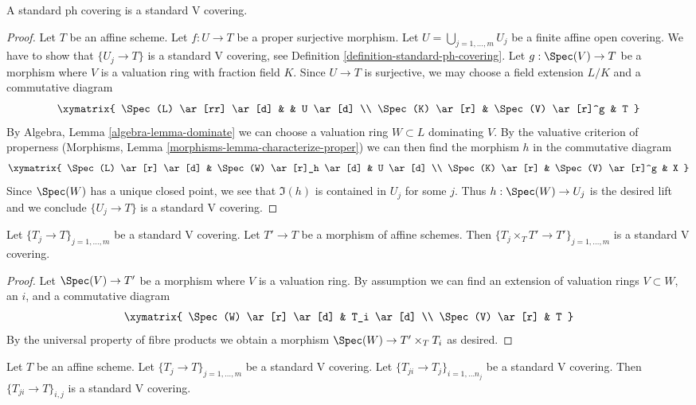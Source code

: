 \begin{lemma}
\label{lemma-standard-ph-standard-V}
A standard ph covering is a standard V covering.
\end{lemma}

\begin{proof}
Let $T$ be an affine scheme. Let $f : U \to T$ be a proper surjective
morphism. Let $U = \bigcup_{j = 1, \ldots, m} U_j$ be a finite
affine open covering. We have to show that $\{U_j \to T\}$
is a standard V covering, see
Definition \ref{definition-standard-ph-covering}.
Let $g : \Spec(V) \to T$
be a morphism where $V$ is a valuation ring with fraction field $K$.
Since $U \to T$ is surjective, we may choose a field extension
$L/K$ and a commutative diagram
$$
\xymatrix{
\Spec(L) \ar[rr] \ar[d] & & U \ar[d] \\
\Spec(K) \ar[r] & \Spec(V) \ar[r]^g & T
}
$$
By Algebra, Lemma \ref{algebra-lemma-dominate} we can choose a valuation ring
$W \subset L$ dominating $V$. By the valuative criterion of
properness (Morphisms, Lemma \ref{morphisms-lemma-characterize-proper})
we can then find the morphism $h$ in the commutative
diagram
$$
\xymatrix{
\Spec(L) \ar[r] \ar[d] & \Spec(W) \ar[r]_h \ar[d] & U \ar[d] \\
\Spec(K) \ar[r] & \Spec(V) \ar[r]^g & X
}
$$
Since $\Spec(W)$ has a unique closed point, we see that $\Im(h)$
is contained in $U_j$ for some $j$. Thus $h : \Spec(W) \to U_j$
is the desired lift and we conclude $\{U_j \to T\}$ is a standard V covering.
\end{proof}

\begin{lemma}
\label{lemma-base-change-standard-V}
Let $\{T_j \to T\}_{j = 1, \ldots, m}$ be a standard V covering.
Let $T' \to T$ be a morphism of affine schemes.
Then $\{T_j \times_T T' \to T'\}_{j = 1, \ldots, m}$ is a
standard V covering.
\end{lemma}

\begin{proof}
Let $\Spec(V) \to T'$ be a morphism where $V$ is a valuation ring.
By assumption we can find an extension of valuation rings $V \subset W$,
an $i$, and a commutative diagram
$$
\xymatrix{
\Spec(W) \ar[r] \ar[d] & T_i \ar[d] \\
\Spec(V) \ar[r] & T
}
$$
By the universal property of fibre products
we obtain a morphism $\Spec(W) \to T' \times_T T_i$
as desired.
\end{proof}

\begin{lemma}
\label{lemma-composition-standard-V}
Let $T$ be an affine scheme. Let $\{T_j \to T\}_{j = 1, \ldots, m}$
be a standard V covering. Let $\{T_{ji} \to T_j\}_{i = 1, \ldots n_j}$
be a standard V covering. Then $\{T_{ji} \to T\}_{i, j}$
is a standard V covering.
\end{lemma}

